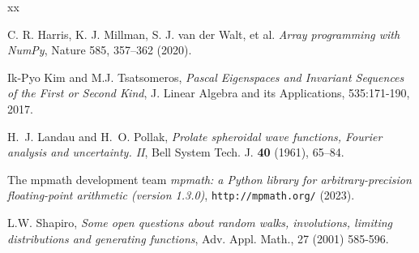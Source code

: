 \documentclass[11pt]{amsart}
\theoremstyle{plain}
\theoremstyle{named}
\begin{document}
\begin{thebibliography}{xx}


 C. R. Harris, K. J. Millman, S. J. van der Walt,  et al. {\emph{Array programming with NumPy}}, Nature 585, 357–362 (2020).




 Ik-Pyo Kim and M.J. Tsatsomeros,
{\emph{Pascal Eigenspaces and Invariant Sequences of the First or Second Kind}}, J. Linear Algebra and its Applications, 535:171-190, 2017.


 H.~J. Landau and H.~O. Pollak, {\em{Prolate spheroidal wave functions, {F}ourier analysis and
uncertainty. {II}}}, Bell System Tech. J. {\bf{40}} (1961), 65--84.






 The mpmath development team {\em{mpmath: a {P}ython library for arbitrary-precision floating-point arithmetic (version 1.3.0)}}, {{\tt http://mpmath.org/}} (2023).

 L.W. Shapiro, {\em{Some open questions about random walks, involutions, limiting distributions and generating functions}}, Adv. Appl. Math., 27 (2001) 585-596.


\end{thebibliography}
\end{document}
